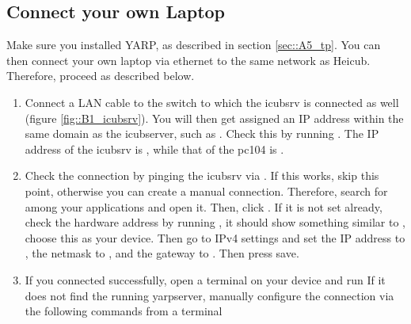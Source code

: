 \subsection{Connect your own Laptop}
Make sure you installed YARP, as described in section \ref{sec::A5_tp}. You can then connect your own laptop via ethernet to the same network as Heicub. Therefore, proceed as described below.
\begin{enumerate}
	\item  Connect a LAN cable to the switch to which the icubsrv is connected as well (figure \ref{fig::B1_icubsrv}). You will then get assigned an IP address within the same domain as the icubserver, such as . Check this by running . The IP address of the icubsrv is , while that of the pc104 is .
	\item  Check the connection by pinging the icubsrv via . If this works, skip this point, otherwise you can create a manual connection.  Therefore, search for  among your applications and open it. Then, click . If it is not set already, check the hardware address by running , it should show something similar to , choose this as your device. Then go to IPv4 settings and set the IP address to , the netmask to , and the gateway to . Then press save.
	\item If you connected successfully, open a terminal on your device and run \newline {} \newline If it does not find the running yarpserver, manually configure the connection via the following commands from a terminal \newline {} \newline {} \newline {}
\end{enumerate}
\FloatBarrier
